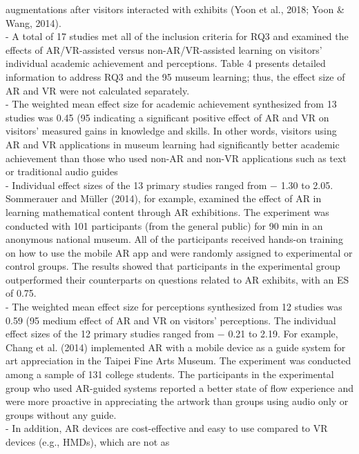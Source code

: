 augmentations after visitors interacted with exhibits (Yoon et al., 2018; Yoon & Wang, 2014).
\\
- A total of 17 studies met all of the inclusion criteria for RQ3 and examined the effects of AR/VR-assisted versus non-AR/VR-assisted
learning on visitors’ individual academic achievement and perceptions. Table 4 presents detailed information to address RQ3 and the
95%
museum learning; thus, the effect size of AR and VR were not calculated separately.
\\
- The weighted mean effect size for academic achievement synthesized from 13 studies was 0.45 (95%
indicating a significant positive effect of AR and VR on visitors’ measured gains in knowledge and skills. In other words, visitors using
AR and VR applications in museum learning had significantly better academic achievement than those who used non-AR and non-VR
applications such as text or traditional audio guides
\\
- Individual effect sizes of the 13 primary studies ranged from − 1.30 to 2.05.
Sommerauer and Müller (2014), for example, examined the effect of AR in learning mathematical content through AR exhibitions. The
experiment was conducted with 101 participants (from the general public) for 90 min in an anonymous national museum. All of the
participants received hands-on training on how to use the mobile AR app and were randomly assigned to experimental or control
groups. The results showed that participants in the experimental group outperformed their counterparts on questions related to AR
exhibits, with an ES of 0.75.
\\
- The weighted mean effect size for perceptions synthesized from 12 studies was 0.59 (95%
medium effect of AR and VR on visitors’ perceptions. The individual effect sizes of the 12 primary studies ranged from − 0.21 to 2.19.
For example, Chang et al. (2014) implemented AR with a mobile device as a guide system for art appreciation in the Taipei Fine Arts
Museum. The experiment was conducted among a sample of 131 college students. The participants in the experimental group who used
AR-guided systems reported a better state of flow experience and were more proactive in appreciating the artwork than groups using
audio only or groups without any guide.
\\
- In addition, AR devices are cost-effective and easy to use compared to VR devices (e.g., HMDs), which are not as
